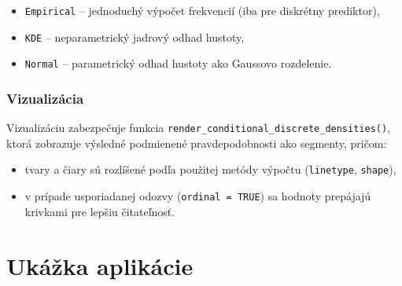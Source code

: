 \begin{itemize}
\setlength{\itemsep}{0pt}
  \setlength{\parskip}{0pt}
  \item \texttt{Empirical} – jednoduchý výpočet frekvencií (iba pre diskrétny prediktor),
  \item \texttt{KDE} – neparametrický jadrový odhad hustoty,
  \item \texttt{Normal} – parametrický odhad hustoty ako Gaussovo rozdelenie.
\end{itemize}

\subsubsection{Vizualizácia}

Vizualizáciu zabezpečuje funkcia \texttt{render\_conditional\_discrete\_densities()}, ktorá zobrazuje výsledné podmienené pravdepodobnosti ako segmenty, pričom:

\begin{itemize}
\setlength{\itemsep}{0pt}
  \setlength{\parskip}{0pt}
  \item tvary a čiary sú rozlíšené podľa použitej metódy výpočtu (\texttt{linetype}, \texttt{shape}),
  \item v prípade usporiadanej odozvy (\texttt{ordinal = TRUE}) sa hodnoty prepájajú krivkami pre lepšiu čitateľnosť.
\end{itemize}


\section{Ukážka aplikácie}\label{sec:app_preview}


